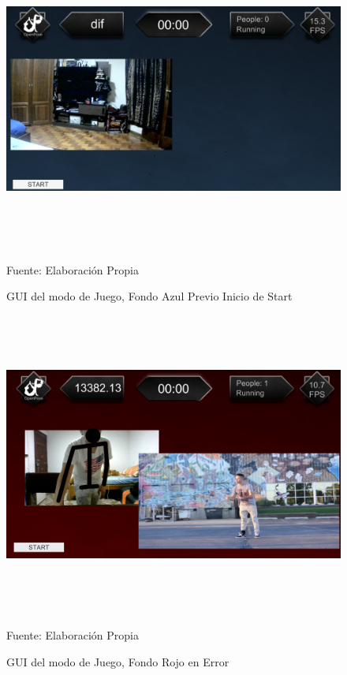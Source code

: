 \clearpage
\begin{figure}[h]
\centering
\includegraphics[width=16cm,height=10cm]{./Images/play0.png}
\caption{GUI del modo de Juego, Fondo Azul Previo Inicio de Start}
\footnotesize Fuente: Elaboración Propia
\label{gui4.1}
\end{figure}

\clearpage
\begin{figure}[h]
	\centering
	\includegraphics[width=16cm,height=10cm]{./Images/play1.png}
	\caption{GUI del modo de Juego, Fondo Rojo en Error}
	\footnotesize Fuente: Elaboración Propia
	\label{gui4.2}
\end{figure}

